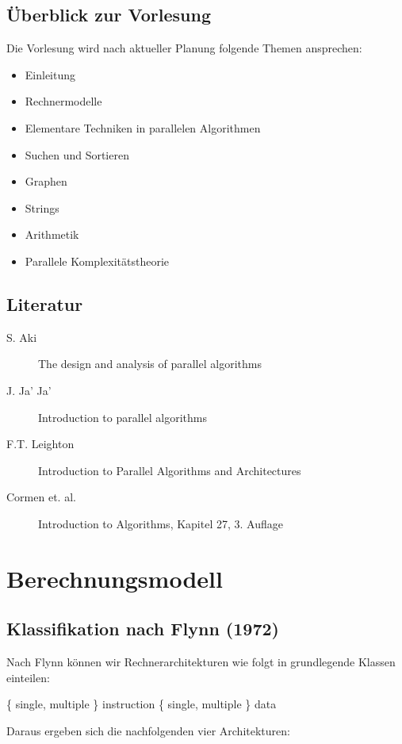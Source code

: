 \pagebreak

\section{Überblick zur Vorlesung}
Die Vorlesung wird nach aktueller Planung folgende Themen ansprechen:

\begin{itemize}
\item Einleitung
\item Rechnermodelle
\item Elementare Techniken in parallelen Algorithmen
\item Suchen und Sortieren
\item Graphen
\item Strings
\item Arithmetik
\item Parallele Komplexitätstheorie
\end{itemize}

\section{Literatur}
\begin{description}
\item[S. Aki] The design and analysis of parallel algorithms
\item[J. Ja' Ja'] Introduction to parallel algorithms
\item[F.T. Leighton] Introduction to Parallel Algorithms and Architectures
\item[Cormen et. al.] Introduction to Algorithms, Kapitel 27, 3. Auflage
\end{description}

\chapter{Berechnungsmodell}
\newpage

\section{Klassifikation nach Flynn (1972)}
Nach Flynn können wir Rechnerarchitekturen wie folgt in grundlegende Klassen einteilen:

\begin{center}
\{ single, multiple \} instruction \{ single, multiple \} data
\end{center}

Daraus ergeben sich die nachfolgenden vier Architekturen:

